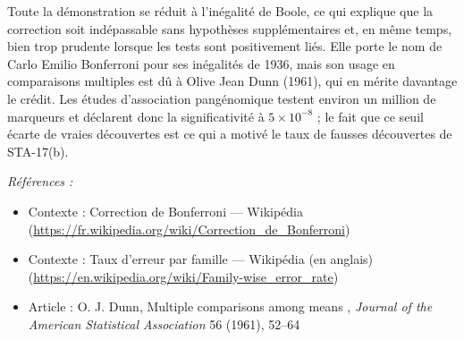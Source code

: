 \documentclass[11pt]{article}
\newenvironment{refs}{\par\small\noindent\emph{Références :}\begin{itemize}\setlength\itemsep{0pt}}{\end{itemize}\normalsize}
\begin{document}
\noindent Toute la démonstration se réduit à l'inégalité de Boole, ce qui explique que la
correction soit indépassable sans hypothèses supplémentaires et, en même temps, bien trop prudente
lorsque les tests sont positivement liés. Elle porte le nom de Carlo Emilio Bonferroni pour ses
inégalités de 1936, mais son usage en comparaisons multiples est dû à Olive Jean Dunn (1961), qui
en mérite davantage le crédit. Les études d'association pangénomique testent environ un million de
marqueurs et déclarent donc la significativité à $ 5 \times 10^{-8} $ ; le fait que ce seuil
écarte de vraies découvertes est ce qui a motivé le taux de fausses découvertes de STA-17(b).

\begin{refs}
\item Contexte : Correction de Bonferroni --- Wikipédia (\url{https://fr.wikipedia.org/wiki/Correction_de_Bonferroni})
\item Contexte : Taux d'erreur par famille --- Wikipédia (en anglais) (\url{https://en.wikipedia.org/wiki/Family-wise_error_rate})
\item Article : O. J. Dunn, \og{} Multiple comparisons among means \fg{}, \textit{Journal of the American Statistical Association} 56 (1961), 52--64
\end{refs}

\bigskip
\end{document}
